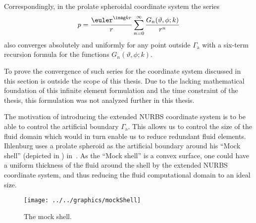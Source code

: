 Correspondingly, in the prolate spheroidal coordinate system the series
\begin{equation*}
	p = \frac{\euler^{\imag kr}}{r}\sum_{n=0}^\infty \frac{G_n(\vartheta,\phi; k)}{r^n}
\end{equation*}
also converges absolutely and uniformly for any point outside $\Gamma_{\mathrm{a}}$ with a six-term recursion formula for the functions $G_n(\vartheta,\phi; k)$.

To prove the convergence of such series for the coordinate system discussed in this section is outside the scope of this thesis. Due to the lacking mathematical foundation of this infinite element formulation and the time constraint of the thesis, this formulation was not analyzed further in this thesis.

The motivation of introducing the extended NURBS coordinate system is to be able to control the artificial boundary $\Gamma_{\mathrm{a}}$. This allows us to control the size of the fluid domain which would in turn enable us to reduce redundant fluid elements. Ihlenburg uses a prolate spheroid as the artificial boundary around his ``Mock shell'' (depicted in ) in~\cite{Ihlenburg1998fea}. As the ``Mock shell'' is a convex surface, one could have a uniform thickness of the fluid around the shell by the extended NURBS coordinate system, and thus reducing the fluid computational domain to an ideal size. 
\begin{figure}
	\centering
	\texttt{[image: ../../graphics/mockShell]}
	\caption[The mock shell]{The mock shell.}
	\label{Fig2:mockShell}
\end{figure}
%

